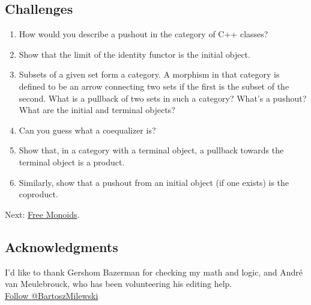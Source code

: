 \subsection{Challenges}\label{challenges}

\begin{enumerate}
\tightlist
\item
  How would you describe a pushout in the category of C++ classes?
\item
  Show that the limit of the identity functor
   is the initial object.
\item
  Subsets of a given set form a category. A morphism in that category is
  defined to be an arrow connecting two sets if the first is the subset
  of the second. What is a pullback of two sets in such a category?
  What's a pushout? What are the initial and terminal objects?
\item
  Can you guess what a coequalizer is?
\item
  Show that, in a category with a terminal object, a pullback towards
  the terminal object is a product.
\item
  Similarly, show that a pushout from an initial object (if one exists)
  is the coproduct.
\end{enumerate}

Next: \href{https://bartoszmilewski.com/2015/07/21/free-monoids/}{Free
Monoids}.

\subsection{Acknowledgments}\label{acknowledgments}

I'd like to thank Gershom Bazerman for checking my math and logic, and
André van Meulebrouck, who has been volunteering his editing help.\\
\href{https://twitter.com/BartoszMilewski}{Follow @BartoszMilewski}
